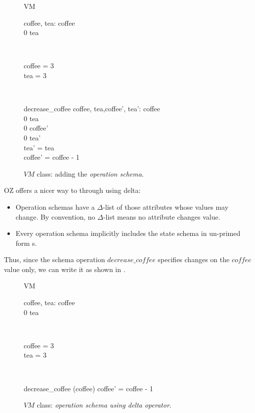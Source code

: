 \begin{itemize}
\begin{figure}[H]
\begin{class}{VM}
\\
\begin{state}
coffee, tea: \integer
{} \leq  coffee 
\\
0 \leq  tea 
\end{state} 
\\
\begin{init}
coffee = 3
\\tea = 3
\end{init} 
\\
\begin{op}{decrease\_coffee}
coffee, tea,coffee', tea': \integer
{} \leq  coffee 
\\
0 \leq  tea 
\\
0 \leq  coffee' 
\\
0 \leq  tea' 
\\
tea' = tea
\\
coffee' = coffee - 1
\end{op}
\end{class}
\caption{$VM$ class: adding the \textit{operation schema}.}
\label{oz_VM_op}
\end{figure}
OZ offers a nicer way to through using delta: 
\begin{itemize}
\item Operation schemas have a 	$\Delta$-list of those attributes
whose values may change. By convention, no 	$\Delta$-list means
no attribute changes value.
\item Every operation schema implicitly
includes the state schema in un-primed form s.
\end{itemize}
Thus, since the schema operation $decrease\_coffee$ specifies changes on the $coffee$ value only, we can write it as shown in . 
\begin{figure}[H]
\centering
\begin{class}{VM}
\\
\begin{state}
coffee, tea: \integer
{} \leq  coffee 
\\
0 \leq  tea 
\end{state} 
\\
\begin{init}
coffee = 3
\\tea = 3
\end{init} 
\\
\begin{op}{decrease\_coffee}
\Delta (coffee)
\ST
coffee' = coffee - 1
\end{op}
\end{class}
\caption{$VM$ class: \textit{operation schema using delta operator}.}
\label{oz_VM_op_delta}
\end{figure}
\end{itemize}



